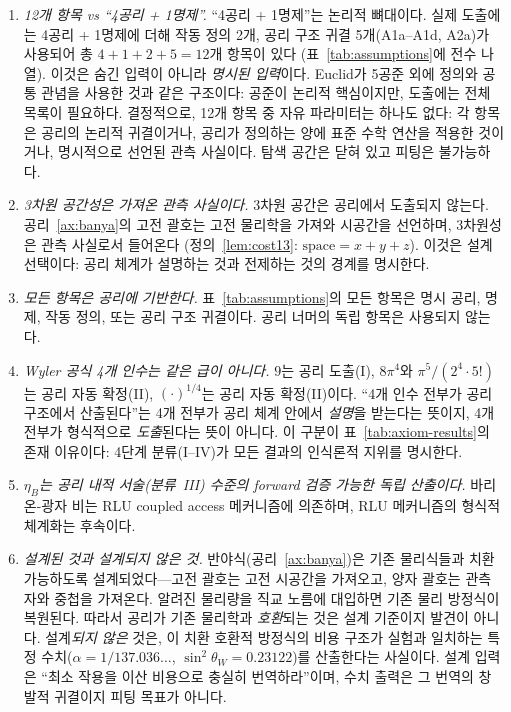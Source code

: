 \documentclass[entropy,article,submit,pdftex,oneauthor]{Definitions/mdpi}
\begin{document}
\begin{enumerate}
\item \emph{12개 항목 vs ``4공리 + 1명제''.} ``4공리 + 1명제''는 논리적 뼈대이다. 실제 도출에는 4공리 + 1명제에 더해 작동 정의 2개, 공리 구조 귀결 5개(A1a--A1d, A2a)가 사용되어 총 $4{+}1{+}2{+}5 = 12$개 항목이 있다 (표~\ref{tab:assumptions}에 전수 나열). 이것은 숨긴 입력이 아니라 \emph{명시된 입력}이다. Euclid가 5공준 외에 정의와 공통 관념을 사용한 것과 같은 구조이다: 공준이 논리적 핵심이지만, 도출에는 전체 목록이 필요하다. 결정적으로, 12개 항목 중 자유 파라미터는 하나도 없다: 각 항목은 공리의 논리적 귀결이거나, 공리가 정의하는 양에 표준 수학 연산을 적용한 것이거나, 명시적으로 선언된 관측 사실이다. 탐색 공간은 닫혀 있고 피팅은 불가능하다.

\item \emph{3차원 공간성은 가져온 관측 사실이다.} 3차원 공간은 공리에서 도출되지 않는다. 공리~\ref{ax:banya}의 고전 괄호는 고전 물리학을 가져와 시공간을 선언하며, 3차원성은 관측 사실로서 들어온다 (정의~\ref{lem:cost13}: $\mathrm{space} = x+y+z$). 이것은 설계 선택이다: 공리 체계가 설명하는 것과 전제하는 것의 경계를 명시한다.

\item \emph{모든 항목은 공리에 기반한다.} 표~\ref{tab:assumptions}의 모든 항목은 명시 공리, 명제, 작동 정의, 또는 공리 구조 귀결이다. 공리 너머의 독립 항목은 사용되지 않는다.

\item \emph{Wyler 공식 4개 인수는 같은 급이 아니다.} $9$는 공리 도출(I), $8\pi^4$와 $\pi^5/(2^4 \cdot 5!)$는 공리 자동 확정(II), $(\cdot)^{1/4}$는 공리 자동 확정(II)이다. ``4개 인수 전부가 공리 구조에서 산출된다''는 4개 전부가 공리 체계 안에서 \emph{설명}을 받는다는 뜻이지, 4개 전부가 형식적으로 \emph{도출}된다는 뜻이 아니다. 이 구분이 표~\ref{tab:axiom-results}의 존재 이유이다: 4단계 분류(I--IV)가 모든 결과의 인식론적 지위를 명시한다.

\item \emph{$\eta_B$는 공리 내적 서술(분류~III) 수준의 forward 검증 가능한 독립 산출이다.} 바리온-광자 비는 RLU coupled access 메커니즘에 의존하며, RLU 메커니즘의 형식적 체계화는 후속이다.

\item \emph{설계된 것과 설계되지 않은 것.} 반야식(공리~\ref{ax:banya})은 기존 물리식들과 치환 가능하도록 설계되었다---고전 괄호는 고전 시공간을 가져오고, 양자 괄호는 관측자와 중첩을 가져온다. 알려진 물리량을 직교 노름에 대입하면 기존 물리 방정식이 복원된다. 따라서 공리가 기존 물리학과 \emph{호환}되는 것은 설계 기준이지 발견이 아니다. 설계\emph{되지 않은} 것은, 이 치환 호환적 방정식의 비용 구조가 실험과 일치하는 특정 수치($\alpha = 1/137.036\ldots$, $\sin^2\theta_W = 0.23122$)를 산출한다는 사실이다. 설계 입력은 ``최소 작용을 이산 비용으로 충실히 번역하라''이며, 수치 출력은 그 번역의 창발적 귀결이지 피팅 목표가 아니다.
\end{enumerate}
\end{document}
